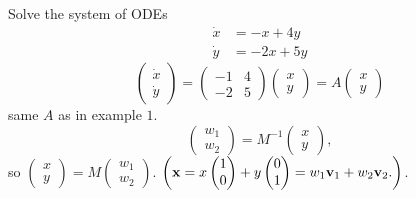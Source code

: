 \documentclass[10pt, a4paper]{article}
\begin{document}
\begin{example}
    Solve the system of ODEs
    \begin{align}
        \dot{x} &= -x + 4y \\
        \dot{y} &= -2x + 5y
    \end{align}
    \[
    \begin{pmatrix}
        \dot{x} \\ \dot{y}
    \end{pmatrix}
    =
    \begin{pmatrix}
        -1 & 4 \\
        -2 & 5
    \end{pmatrix}
    \begin{pmatrix}
        x \\ y
    \end{pmatrix}
    = A\begin{pmatrix}
        x \\ y
    \end{pmatrix}
    \]
    same $A$ as in example $1$.
    \[
    \begin{pmatrix}
        w_1 \\ w_2
    \end{pmatrix} = M ^ {-1}\begin{pmatrix}
        x \\ y
    \end{pmatrix},
    \]
    so $\begin{pmatrix}
        x \\ y
    \end{pmatrix} = M\begin{pmatrix}
        w_1 \\ w_2
    \end{pmatrix}$.
    $\left(
    \mathbf{x} = x\begin{pmatrix}
        1 \\ 0
    \end{pmatrix} + y\begin{pmatrix}
        0 \\ 1
    \end{pmatrix}
    =
    w_1\mathbf{v}_1 + w_2\mathbf{v}_2.
    \right)$.


\end{example}
\end{document}
